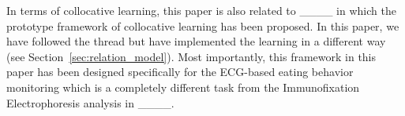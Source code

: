 	In terms of collocative learning, this paper is also related to ____ in which the prototype framework of collocative learning has been proposed. In this paper, we have followed the thread but have implemented the learning in a different way (see Section~\ref{sec:relation_model}). Most importantly, this framework in this paper has been designed specifically for the ECG-based eating behavior monitoring which is a completely different task from the Immunofixation Electrophoresis analysis in ____.
	
